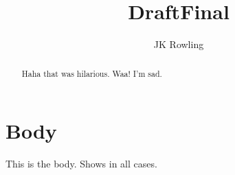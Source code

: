 \documentclass[]{article}
\title{Draft}
\title{Final}
\author{JK Rowling}
\begin{document}
\maketitle

\begin{abstract}
    Haha that was hilarious.
    Waa! I'm sad.
\end{abstract}

\section{Body}

This is the body. Shows in all cases.
\end{document}
